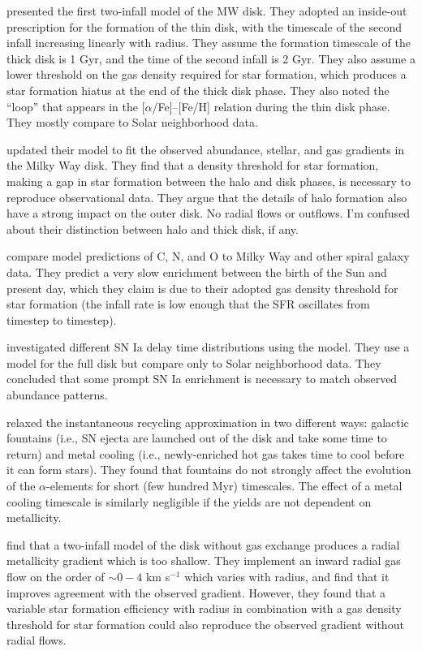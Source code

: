 \documentclass[twocolumn,twocolappendix,linenumbers]{aastex631}
\newcommand{\aFe}{[$\alpha$/Fe]\xspace}
\begin{document}
\citet{chiappini_chemical_1997} presented the first two-infall model of the MW disk. They adopted an inside-out prescription for the formation of the thin disk, with the timescale of the second infall increasing linearly with radius. They assume the formation timescale of the thick disk is 1 Gyr, and the time of the second infall is 2 Gyr. They also assume a lower threshold on the gas density required for star formation, which produces a star formation hiatus at the end of the thick disk phase. They also noted the ``loop'' that appears in the \aFe--[Fe/H] relation during the thin disk phase. They mostly compare to Solar neighborhood data.

\citet{chiappini_abundance_2001} updated their model to fit the observed abundance, stellar, and gas gradients in the Milky Way disk. They find that a density threshold for star formation, making a gap in star formation between the halo and disk phases, is necessary to reproduce observational data. They argue that the details of halo formation also have a strong impact on the outer disk. No radial flows or outflows. I'm confused about their distinction between halo and thick disk, if any.

\citet{chiappini_oxygen_2003} compare model predictions of C, N, and O to Milky Way and other spiral galaxy data. They predict a very slow enrichment between the birth of the Sun and present day, which they claim is due to their adopted gas density threshold for star formation (the infall rate is low enough that the SFR oscillates from timestep to timestep).

\citet{matteucci_effect_2009} investigated different SN Ia delay time distributions using the \citep{chiappini_chemical_1997,chiappini_abundance_2001} model. They use a model for the full disk but compare only to Solar neighborhood data. They concluded that some prompt SN Ia enrichment is necessary to match observed abundance patterns.

\citet{spitoni_effects_2009} relaxed the instantaneous recycling approximation in two different ways: galactic fountains (i.e., SN ejecta are launched out of the disk and take some time to return) and metal cooling (i.e., newly-enriched hot gas takes time to cool before it can form stars). They found that fountains do not strongly affect the evolution of the $\alpha$-elements for short (few hundred Myr) timescales. The effect of a metal cooling timescale is similarly negligible if the yields are not dependent on metallicity.

\citet{spitoni_effects_2011} find that a two-infall model of the disk without gas exchange produces a radial metallicity gradient which is too shallow. They implement an inward radial gas flow on the order of $\sim0-4$ km s$^{-1}$ which varies with radius, and find that it improves agreement with the observed gradient. However, they found that a variable star formation efficiency with radius in combination with a gas density threshold for star formation could also reproduce the observed gradient without radial flows.
\end{document}

